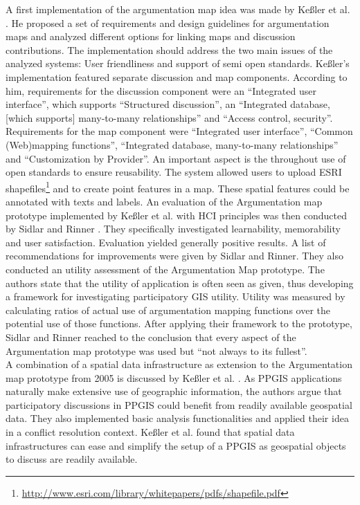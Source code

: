 A first implementation of the argumentation map idea was made by Ke{\ss}ler et al. \cite{Kessler2005_ArgumentationMapPrototype}. He proposed a set of requirements and design guidelines for argumentation maps and analyzed different options for linking maps and discussion contributions. The implementation should address the two main issues of the analyzed systems: User friendliness and support of semi open standards. Ke{\ss}ler's implementation featured separate discussion and map components. According to him, requirements for the discussion component were an ``Integrated user interface'', which supports ``Structured discussion'', an ``Integrated database, [which supports] many-to-many relationships'' and ``Access control, security''. Requirements for the map component were ``Integrated user interface'', ``Common (Web)mapping functions'', ``Integrated database, many-to-many relationships'' and ``Customization by Provider''. An important aspect is the throughout use of open standards to ensure reusability. The system allowed users to upload ESRI shapefiles\footnote{\url{http://www.esri.com/library/whitepapers/pdfs/shapefile.pdf}} and to create point features in a map. These spatial features could be annotated with texts and labels. An evaluation of the Argumentation map prototype implemented by Ke{\ss}ler et al. with HCI principles was then conducted by Sidlar and Rinner \cite{sidlar_argumap_2007}. They specifically investigated learnability, memorability and user satisfaction. Evaluation yielded generally positive results. A list of recommendations for improvements were given by Sidlar and Rinner. They also conducted an utility assessment \cite{Sidlar2009-AssessmentMapGeocollaborationTool} of the Argumentation Map prototype. The authors state that the utility of application is often seen as given, thus developing a framework for investigating participatory GIS utility. Utility was measured by calculating ratios of actual use of argumentation mapping functions over the potential use of those functions. After applying their framework to the prototype, Sidlar and Rinner reached to the conclusion that every aspect of the Argumentation map prototype was used but ``not always to its fullest''.\\
A combination of a spatial data infrastructure as extension to the Argumentation map prototype from 2005 is discussed by Ke{\ss}ler et al. \cite{Kessler2005_Conflict_Resolution}. As PPGIS applications naturally make extensive use of geographic information, the authors argue that participatory discussions in PPGIS could benefit from readily available geospatial data. They also implemented basic analysis functionalities and applied their idea in a conflict resolution context. Ke{\ss}ler et al. found that spatial data infrastructures can ease and simplify the setup of a PPGIS as geospatial objects to discuss are readily available.\\
